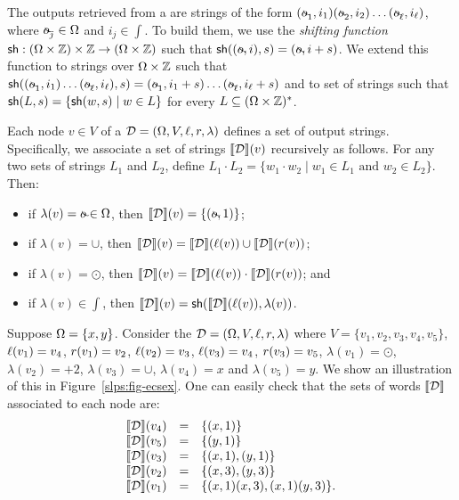 The outputs retrieved from a \dsabbr are strings of the form $(\oout_1, i_1)(\oout_2, i_2)\ldots(\oout_\ell, i_\ell)$, where $\oout_j\in\infAlph$ and $i_j\in\int$.
To build them, we use the {\em shifting function} $\mathsf{sh}: (\Omega \times \mathbb{Z}) \times \mathbb{Z} \to (\Omega \times \mathbb{Z})$ such that $\shift((\oout, i), s) = (\oout, i+s)$.
We extend this function to strings over $\Omega \times \mathbb{Z}$ such that $\shift((\oout_1, i_1)\ldots(\oout_\ell, i_\ell), s) = (\oout_1, i_1+s)\ldots(\oout_\ell, i_\ell+s)$ and to set of strings such that $\mathsf{sh}(L, s) = \{\mathsf{sh}(w, s) \mid w \in L\}$ for every $L \subseteq (\Omega \times \mathbb{Z})^*$.

Each node $v \in V$ of a \dsabbr $\mathcal{D} = (\Omega, V, \ell, r, \lambda)$ defines a set of output strings. Specifically, we associate a set of strings ${\llbracket{\mathcal{D}}\rrbracket}(v)$ recursively as follows. For any two sets of strings $L_1$ and $L_2$, define $L_1 \cdot L_2 = \{w_1\cdot w_2 \mid w_1\in L_1\text{ and }w_2\in L_2\}$. Then: 
\begin{itemize}
	\item if $\lambda(v) = \oout \in \infAlph$, then $\sem{\cD}(v) = \{(\oout, 1)\}$;
	\item if $\lambda(v) = \cup$, then ${\llbracket{\mathcal{D}}\rrbracket}(v) = {\llbracket{\mathcal{D}}\rrbracket}(\ell(v)) \cup {\llbracket{\mathcal{D}}\rrbracket}(r(v))$;
	\item if $\lambda(v) = \odot$, then ${\llbracket{\mathcal{D}}\rrbracket}(v) = {\llbracket{\mathcal{D}}\rrbracket}(\ell(v)) \cdot {\llbracket{\mathcal{D}}\rrbracket}(r(v))$; and 
	\item if $\lambda(v) \in \int$, then ${\llbracket{\mathcal{D}}\rrbracket}(v) = \mathsf{sh}({\llbracket{\mathcal{D}}\rrbracket}(\ell(v)), \lambda(v))$.
\end{itemize}

\begin{example}
Suppose $\Omega = \{x, y\}$. 
Consider the \dsabbr $\mathcal{D} = (\Omega, V, \ell, r, \lambda)$ where $V = \{v_1, v_2, v_3, v_4, v_5\}$, $\ell(v_1) = v_4$, $r(v_1) = v_2$, $\ell(v_2) = v_3$, $\ell(v_3) = v_4$, $r(v_3) = v_5$, $\lambda(v_1) = \odot$, $\lambda(v_2) = +2$, $\lambda(v_3) = \cup$, $\lambda(v_4) = x$ and $\lambda(v_5) = y$. 
We show an illustration of this \dsabbr in Figure~\ref{slps:fig-ecsex}. One can easily check that the sets of words ${\llbracket{\mathcal{D}}\rrbracket}$ associated to each node are: 
$$
\begin{array}{rcl}
	{\llbracket{\mathcal{D}}\rrbracket}(v_4) & = & \{(x, 1)\} \\  {\llbracket{\mathcal{D}}\rrbracket}(v_5) & = & \{(y, 1)\} \\ {\llbracket{\mathcal{D}}\rrbracket}(v_3) & = & \{(x, 1), (y, 1)\} \\ {\llbracket{\mathcal{D}}\rrbracket}(v_2) & = & \{(x, 3), (y, 3)\} \\
	{\llbracket{\mathcal{D}}\rrbracket}(v_1) & = & \{(x, 1)(x, 3), (x, 1)(y, 3)\}.
\end{array}
$$
\end{example}

